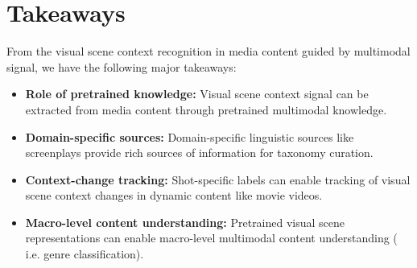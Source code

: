 \section{Takeaways}
From the visual scene context recognition in media content guided by multimodal signal, we have the following major takeaways:
\begin{itemize}
    \item \textbf{Role of pretrained knowledge:} Visual scene context signal can be extracted from media content through pretrained multimodal knowledge.
    \item \textbf{Domain-specific sources:} Domain-specific linguistic sources like screenplays provide rich sources of information for taxonomy curation.
    \item \textbf{Context-change tracking:} Shot-specific labels can enable tracking of visual scene context changes in dynamic content like movie videos.
    \item \textbf{Macro-level content understanding:} Pretrained visual scene representations can enable macro-level multimodal content understanding ( i.e. genre classification).
\end{itemize}






